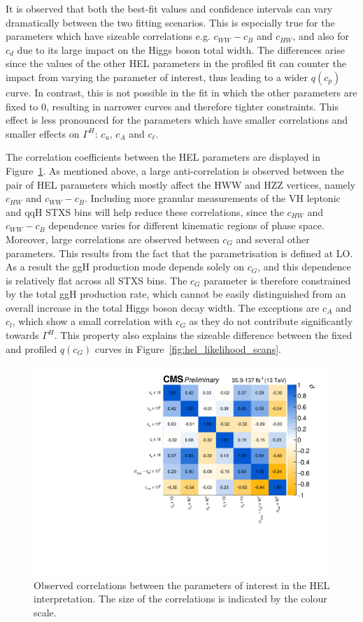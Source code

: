 It is observed that both the best-fit values and confidence intervals can vary dramatically between the two fitting scenarios. This is especially true for the parameters which have sizeable correlations e.g. $c_{WW}-c_B$ and $c_{HW}$, and also for $c_d$ due to its large impact on the Higgs boson total width. The differences arise since the values of the other HEL parameters in the profiled fit can counter the impact from varying the parameter of interest, thus leading to a wider $q(c_p)$ curve. In contrast, this is not possible in the fit in which the other parameters are fixed to 0, resulting in narrower curves and therefore tighter constraints. This effect is less pronounced for the parameters which have smaller correlations and smaller effects on $\Gamma^H$: $c_u$, $c_A$ and $c_\ell$. 

The correlation coefficients between the HEL parameters are displayed in Figure~\ref{fig:hel_correlations}. As mentioned above, a large anti-correlation is observed between the pair of HEL parameters which mostly affect the HWW and HZZ vertices, namely $c_{HW}$ and $c_{WW}-c_B$. Including more granular measurements of the VH leptonic and qqH STXS bins will help reduce these correlations, since the $c_{HW}$ and $c_{WW}-c_B$ dependence varies for different kinematic regions of phase space. Moreover, large correlations are observed between $c_G$ and several other parameters. This results from the fact that the parametrisation is defined at LO. As a result the ggH production mode depends solely on $c_G$, and this dependence is relatively flat across all STXS bins. The $c_G$ parameter is therefore constrained by the total ggH production rate, which cannot be easily distinguished from an overall increase in the total Higgs boson decay width. The exceptions are $c_A$ and $c_l$, which show a small correlation with $c_G$ as they do not contribute significantly towards $\Gamma^H$. This property also explains the sizeable difference between the fixed and profiled $q(c_G)$ curves in Figure~\ref{fig:hel_likelihood_scans}.

\begin{figure}
  \centering
  \includegraphics[width=.8\textwidth]{Figures/eft/hel_correlations.pdf}
  \caption[Correlations in HEL parameters]
  {
    Observed correlations between the parameters of interest in the HEL interpretation. The size of the correlations is indicated by the colour scale.
  }
  \label{fig:hel_correlations}
\end{figure}

